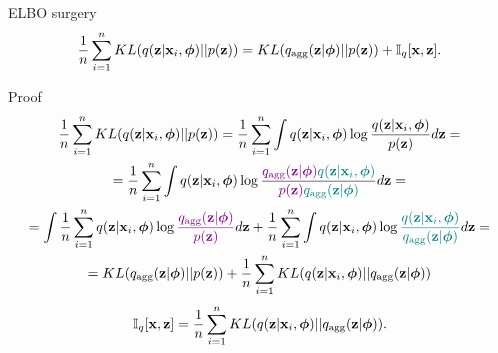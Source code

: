 \begin{frame}{ELBO surgery}
		\vspace{-0.4cm}
		\[
		    \frac{1}{n} \sum_{i=1}^n KL(q(\mathbf{z} | \mathbf{x}_i, \boldsymbol{\phi}) || p(\mathbf{z})) = KL(q_{\text{agg}}(\mathbf{z} | \boldsymbol{\phi}) || p(\mathbf{z})) + \mathbb{I}_q [\mathbf{x}, \mathbf{z}].
		\]
		\vspace{-0.3cm}
	\begin{block}{Proof}
		\vspace{-0.5cm}
		{\footnotesize
		\begin{multline*}
		    \frac{1}{n} \sum_{i=1}^n KL(q(\mathbf{z} | \mathbf{x}_i, \boldsymbol{\phi}) || p(\mathbf{z})) = \frac{1}{n} \sum_{i=1}^n \int q(\mathbf{z} | \mathbf{x}_i, \boldsymbol{\phi}) \log \frac{q(\mathbf{z} | \mathbf{x}_i, \boldsymbol{\phi})}{p(\mathbf{z})} d \mathbf{z} = \\
		    = \frac{1}{n} \sum_{i=1}^n \int q(\mathbf{z} | \mathbf{x}_i, \boldsymbol{\phi}) \log \frac{{\color{violet}q_{\text{agg}}(\mathbf{z} | \boldsymbol{\phi})} {\color{teal}q(\mathbf{z} | \mathbf{x}_i, \boldsymbol{\phi})}}{{\color{violet}p(\mathbf{z})} {\color{teal}q_{\text{agg}}(\mathbf{z} | \boldsymbol{\phi})}} d \mathbf{z} = \\
		    = \int \frac{1}{n} \sum_{i=1}^n  q(\mathbf{z} | \mathbf{x}_i, \boldsymbol{\phi}) \log {\color{violet}\frac{q_{\text{agg}}(\mathbf{z}| \boldsymbol{\phi})}{p(\mathbf{z})}} d \mathbf{z}
		    + \frac{1}{n}\sum_{i=1}^n \int q(\mathbf{z} | \mathbf{x}_i, \boldsymbol{\phi}) \log {\color{teal}\frac{q(\mathbf{z}| \mathbf{x}_i, \boldsymbol{\phi})}{q_{\text{agg}}(\mathbf{z}| \boldsymbol{\phi})}} d \mathbf{z} = \\
		    = KL (q_{\text{agg}}(\mathbf{z} | \boldsymbol{\phi}) || p(\mathbf{z})) + \frac{1}{n}\sum_{i=1}^n KL(q(\mathbf{z} | \mathbf{x}_i, \boldsymbol{\phi}) || q_{\text{agg}}(\mathbf{z} | \boldsymbol{\phi}))
		\end{multline*}
		}
		\vspace{-0.4cm}
		\[
			\mathbb{I}_{q} [\mathbf{x}, \mathbf{z}] = \frac{1}{n}\sum_{i=1}^n KL(q(\mathbf{z} | \mathbf{x}_i, \boldsymbol{\phi}) || q_{\text{agg}}(\mathbf{z} | \boldsymbol{\phi})).
		\]
	\end{block}

\end{frame}
